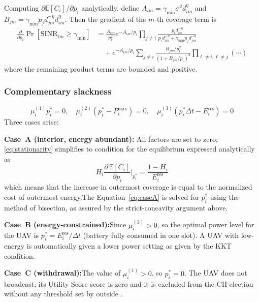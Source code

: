 \documentclass[journal]{IEEEtran}
\begin{document}
Computing $\partial\mathbb{E}[C_{i}]/\partial p_{i}$
analytically, define
$A_{im}=\gamma_{\min}\sigma^{2}d_{im}^{\eta}$ and
$B_{jm}=\gamma_{\min}p_{j}d_{jm}^{-\eta}d_{im}^{\eta}$.
Then the gradient of the $m$-th coverage term is
\begin{align}\label{eq:grad}
  \frac{\partial}{\partial p_{i}}
  \Pr[\mathrm{SINR}_{im}\!\geq\!\gamma_{\min}]
  &=\frac{A_{im}}{p_{i}^{2}}
    e^{-A_{im}/p_{i}}
    \prod_{j\neq i}\frac{p_{i}d_{im}^{-\eta}}
    {p_{i}d_{im}^{-\eta}+\gamma_{\min}p_{j}d_{jm}^{-\eta}}
    \nonumber\\
  &\quad+e^{-A_{im}/p_{i}}
    \sum_{j\neq i}\frac{B_{jm}/p_{i}^{2}}
    {(1+B_{jm}/p_{i})^{2}}
    \!\!\!\prod_{\ell\neq i,\ell\neq j}\!\!\!\!
    (\cdots)
\end{align}
where the remaining product terms are bounded and
positive.

\subsubsection{Complementary slackness}
\begin{equation}\label{eq:cs}
  \mu_{i}^{(1)}p_{i}^{*}=0,\quad
  \mu_{i}^{(2)}(p_{i}^{*}-P_{i}^{\max})=0,\quad
  \mu_{i}^{(3)}(p_{i}^{*}\Delta t-E_{i}^{\mathrm{res}})=0
\end{equation}
Three cases arise:

\textbf{Case~A (interior, energy abundant):}
All factors are set to zero; \eqref{eq:stationarity} simplifies to
condition for the equilibrium expressed analytically as
\begin{equation}\label{eq:caseA}
  H_{i}
  \frac{\partial\,\mathbb{E}[C_{i}]}{\partial p_{i}}
  \Bigg|_{p_{i}^{*}}
  =\frac{1-H_{i}}{E_i^{\mathrm{res}}}
\end{equation}
which  means that the increase in outermost coverage is equal to the normalized cost of outermost energy.The Equation~\eqref{eq:caseA} is
solved for $p_{i}^{*}$ using the method of bisection, as assured by the strict-concavity argument above.

\textbf{Case~B (energy-constrained):}Since
$\mu_{i}^{(3)}>0$, so the optimal power level for the UAV is  $p_{i}^{*}=E_{i}^{\mathrm{res}}/\Delta t$
(battery fully consumed in one slot).  A UAV with low-energy  is
automatically given a lower power setting as given by the KKT condition.

\textbf{Case~C (withdrawal):}The value of
$\mu_{i}^{(1)}>0$, so $p_{i}^{*}=0$.  The UAV does not
broadcast; its Utility Score score is zero and it is excluded from
the CH election without any  threshold set by outside .
\end{document}
